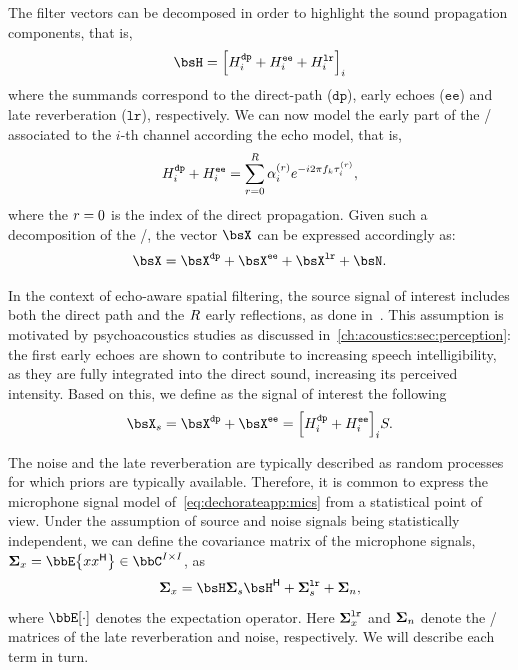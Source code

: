 \mynewline
The filter vectors can be decomposed in order to highlight the sound propagation components, that is,
\begin{equation}
    \FLTS = \kbracket{\FLT^{\mathtt{dp}}_{\idxMic}+ \FLT^{\mathtt{ee}}_{\idxMic} + \FLT^{\mathtt{lr}}_{\idxMic} }_\idxMic
\end{equation}
where the summands correspond to the direct-path ($\mathtt{dp}$), early echoes ($\mathtt{ee}$) and late reverberation ($\mathtt{lr}$), respectively.
We can now model the early part of the \RIR/ associated to the $i$-th channel according the echo model, that is,
\begin{equation}\label{eq:dechorateapp:echomodel}
    H^{\mathtt{dp}}_{i}+ H^{\mathtt{ee}}_{i} = \sum_{r=0}^{R} \alpha_{i}^{(r)} {e}^{-{i} 2 \pi f_k \tau_i^{(r)}}
    ,
\end{equation}
where the $r=0$ is the index of the direct propagation.
Given such a decomposition of the \RIRs/, the vector $\MICS$ can be expressed accordingly as:
\begin{equation}\label{eq:dechorateapp:mics}
    \MICS = \MICS^{\mathtt{dp}} + \MICS^{\mathtt{ee}} + \MICS^{\mathtt{lr}} + \NSES.
\end{equation}

\mynewline
In the context of echo-aware spatial filtering, the source signal of interest includes both the direct path and the $R$ early reflections, as done in~.
This assumption is motivated by psychoacoustics studies as discussed in~\cref{ch:acoustics:sec:perception}:
the first early echoes are shown to contribute to increasing speech intelligibility, as they are fully integrated into the direct sound, increasing its perceived intensity.
Based on this, we define as the signal of interest the following
\begin{equation}\label{eq:dechorateapp:target}
    \MICS_s = \MICS^{\mathtt{dp}} + \MICS^{\mathtt{ee}} = \kbracket{\FLT^{\mathtt{dp}}_{\idxMic}+ \FLT^{\mathtt{ee}}_{\idxMic}}_\idxMic \SRC.
\end{equation}

\mynewline
The noise and the late reverberation are typically described as random processes for which priors are typically available.
Therefore, it is common to express the microphone signal model of~\cref{eq:dechorateapp:mics} from a statistical point of view.
Under the assumption of source and noise signals being statistically independent, we can define the covariance matrix of the microphone signals, $\xpsd_{\mic} = \bbE\kbrace{\mic \khermitian{\mic}} \in \bbC^{\numMics \times \numMics}$, as
\begin{equation}
    \xpsd_{\mic} = \FLTS \xpsd_{\src} \khermitian{\FLTS} + \xpsd^{\mathtt{lr}}_{\src} + \xpsd_{\nse}
    ,
\end{equation}
where $\bbE[\cdot]$ denotes the expectation operator.
Here $\boldsymbol{\Sigma}^{\mathtt{lr}}_{x}$ and $\boldsymbol{\Sigma}_{n}$ denote the \PSD/ matrices of the late reverberation and noise, respectively.
We will describe each term in turn.

